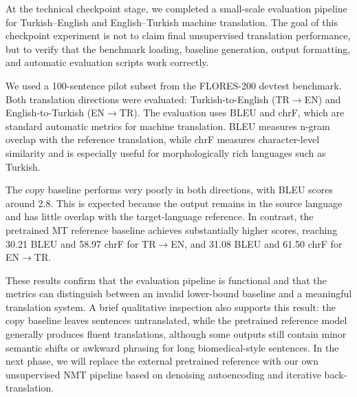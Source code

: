 \documentclass[11pt]{article}
\begin{document}
At the technical checkpoint stage, we completed a small-scale evaluation pipeline for Turkish--English and English--Turkish machine translation. The goal of this checkpoint experiment is not to claim final unsupervised translation performance, but to verify that the benchmark loading, baseline generation, output formatting, and automatic evaluation scripts work correctly.

We used a 100-sentence pilot subset from the FLORES-200 devtest benchmark. Both translation directions were evaluated: Turkish-to-English (TR$\rightarrow$EN) and English-to-Turkish (EN$\rightarrow$TR). The evaluation uses BLEU and chrF, which are standard automatic metrics for machine translation. BLEU measures n-gram overlap with the reference translation, while chrF measures character-level similarity and is especially useful for morphologically rich languages such as Turkish.

\begin{table}[H]
\centering
\caption{Initial checkpoint results on a 100-sentence FLORES-200 devtest pilot subset.}
\label{tab:checkpoint-results}
\end{table}

The copy baseline performs very poorly in both directions, with BLEU scores around 2.8. This is expected because the output remains in the source language and has little overlap with the target-language reference. In contrast, the pretrained MT reference baseline achieves substantially higher scores, reaching 30.21 BLEU and 58.97 chrF for TR$\rightarrow$EN, and 31.08 BLEU and 61.50 chrF for EN$\rightarrow$TR.

These results confirm that the evaluation pipeline is functional and that the metrics can distinguish between an invalid lower-bound baseline and a meaningful translation system. A brief qualitative inspection also supports this result: the copy baseline leaves sentences untranslated, while the pretrained reference model generally produces fluent translations, although some outputs still contain minor semantic shifts or awkward phrasing for long biomedical-style sentences. In the next phase, we will replace the external pretrained reference with our own unsupervised NMT pipeline based on denoising autoencoding and iterative back-translation.
\end{document}

